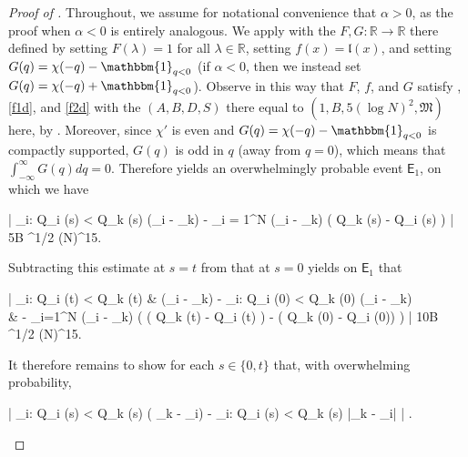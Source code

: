 \documentclass{amsart}
\numberwithin{equation}{section}
\theoremstyle{remark}
\theoremstyle{definition}
\begin{document}
	
	\begin{proof}[Proof of ]
		
		Throughout, we assume for notational convenience that $\alpha > 0$, as the proof when $\alpha < 0$ is entirely analogous. We apply  with the $F, G : \mathbb{R} \rightarrow \mathbb{R}$ there defined by setting $F(\lambda) = 1$ for all $\lambda \in \mathbb{R}$, setting $f(x) = \mathfrak{l} (x)$, and setting $G(q) = \chi (-q) - \mathbbm{1} _{q < 0}$ (if $\alpha < 0$, then we instead set $G(q) = \chi (-q) + \mathbbm{1}_{q < 0}$). Observe in this way that $F$, $f$, and $G$ satisfy , \eqref{f1d}, and \eqref{f2d} with the $(A, B, D, S)$ there equal to $(1, B, 5(\log N)^2, \mathfrak{M} )$ here, by . Moreover, since $\chi'$ is even and $G(q) = \chi(-q) - \mathbbm{1} _{q < 0}$ is compactly supported, $G(q)$ is odd in $q$ (away from $q=0$), which means that $\int_{-\infty}^{\infty} G(q) dq = 0$. Therefore  yields an overwhelmingly probable event $\mathsf{E}_1$, on which we have 
		\begin{flalign*}
		\Bigg|   \displaystyle\sum_{i: Q_i (s) < Q_k (s)}  (\lambda_i - \lambda_k) -  \displaystyle\sum_{i = 1}^N  (\lambda_i - \lambda_k) \cdot \chi ( Q_k (s) - Q_i (s) ) \Bigg| \le 5B ^{1/2} (\log N)^{15}.
		\end{flalign*} 	
		
		\noindent Subtracting this estimate at $s = t$ from that at $s = 0$ yields on $\mathsf{E}_1$ that
		\begin{flalign*}
		 	\Bigg| \displaystyle\sum_{i: Q_i (t) < Q_k (t)} &  (\lambda_i - \lambda_k) - \displaystyle\sum_{i: Q_i (0) < Q_k (0)}  (\lambda_i - \lambda_k) \\ 
			& - \displaystyle\sum_{i=1}^N  (\lambda_i - \lambda_k) \cdot \big( \chi ( Q_k (t) - Q_i (t) ) - \chi ( Q_k (0) - Q_i (0)) \big) \Bigg| \le 10B ^{1/2} (\log N)^{15}.
		\end{flalign*} 
		
		\noindent It therefore remains to show for each $s \in \{ 0, t \}$ that, with overwhelming probability, 
		\begin{flalign}
		\label{qisqks2} 
		\begin{aligned}
			 \Bigg| \displaystyle\sum_{i: Q_i (s) < Q_k (s)}  ( \lambda_k - \lambda_i) - \displaystyle\sum_{i: Q_i (s) < Q_k (s)} \log |\lambda_k - \lambda_i| \Bigg| .
		\end{aligned}
		\end{flalign} 
		

\end{proof}
\end{document}
